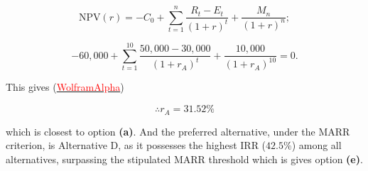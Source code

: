 \documentclass[12pt]{article}
\begin{document}
\[ \text{NPV}(r) = -C_0 + \sum_{t=1}^{n} \frac{R_t - E_t}{(1 + r)^t} + \frac{M_n}{(1 + r)^n}; \]

\[ -60,000 + \sum_{t=1}^{10} \frac{50,000 - 30,000}{(1 + r_A)^t} + \frac{10,000}{(1 + r_A)^{10}} = 0. \]

This gives (\href{https://www.wolframalpha.com/input?i=-60%2C000+%2B+%5Csum_%7Bt%3D1%7D%5E%7B10%7D+%5Cfrac%7B20%2C000%7D%7B%281+%2B+r%29%5Et%7D+%2B+%5Cfrac%7B10%2C000%7D%7B%281+%2B+r%29%5E%7B10%7D%7D+%3D+0}{\textcolor{red}{WolframAlpha}})

\[\therefore r_A = 31.52 \% \]

which is closest to option \textbf{(a)}. And the preferred alternative, under the MARR criterion, is Alternative D, as it possesses the highest IRR (\(42.5\%\)) among all alternatives, surpassing the stipulated MARR threshold which is gives option \textbf{(e)}.
\end{document}
